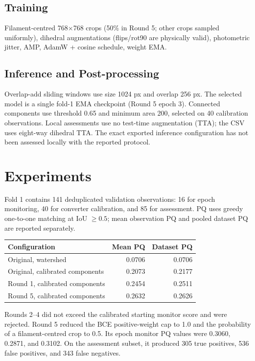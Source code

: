 \documentclass[10pt]{article}
\begin{document}
\subsection{Training}
Filament-centred 768$\times$768 crops (50\% in Round 5; other crops sampled uniformly), dihedral augmentations
(flips/rot90 are physically valid), photometric jitter, AMP, AdamW +
cosine schedule, weight EMA.

\subsection{Inference and Post-processing}
Overlap-add sliding windows use size 1024 px and overlap 256 px.
The selected model is a single fold-1 EMA checkpoint (Round 5 epoch 3).
Connected components use threshold 0.65 and minimum area 200, selected on
40 calibration observations. Local assessments use no test-time augmentation
(TTA); the CSV uses eight-way dihedral TTA. The exact exported inference
configuration has not been assessed locally with the reported protocol.

\section{Experiments}
Fold 1 contains 141 deduplicated validation observations: 16 for epoch
monitoring, 40 for converter calibration, and 85 for assessment. PQ uses
greedy one-to-one matching at IoU $\geq0.5$; mean observation PQ and pooled
dataset PQ are reported separately.
\begin{center}\small
\begin{tabular}{@{}lrr@{}}
\toprule
Configuration & Mean PQ & Dataset PQ \\
\midrule
Original, watershed & 0.0706 & 0.0706 \\
Original, calibrated components & 0.2073 & 0.2177 \\
Round 1, calibrated components & 0.2454 & 0.2511 \\
Round 5, calibrated components & 0.2632 & 0.2626 \\
\bottomrule
\end{tabular}
\end{center}
Rounds 2--4 did not exceed the calibrated starting monitor score and were
rejected. Round 5 reduced the BCE positive-weight cap to 1.0 and the probability
of a filament-centred crop to 0.5. Its epoch monitor PQ values were 0.3060,
0.2871, and 0.3102. On the assessment subset, it produced 305 true positives,
536 false positives, and 343 false negatives.
\end{document}
